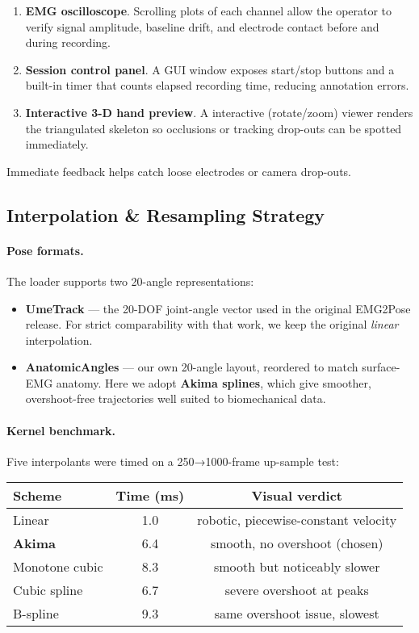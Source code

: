 \begin{enumerate}[label=\alph*]
    \item \textbf{EMG oscilloscope}.  
          Scrolling plots of each channel allow the operator to verify signal amplitude, baseline drift, and electrode contact before and during recording.
    \item \textbf{Session control panel}.  
          A GUI window exposes start/stop buttons and a built-in timer that counts elapsed recording time, reducing annotation errors.
    \item \textbf{Interactive 3-D hand preview}.  
          A interactive (rotate/zoom) viewer renders the triangulated skeleton so occlusions or tracking drop-outs can be spotted immediately.
\end{enumerate}

Immediate feedback helps catch loose electrodes or camera drop-outs.

\subsection{Interpolation \& Resampling Strategy}

\paragraph{Pose formats.}
The loader supports two 20-angle representations:

\begin{itemize}
  \item \textbf{UmeTrack} — the 20-DOF joint-angle vector used in the original
        EMG2Pose release.  For strict comparability with that work, we keep the
        original \emph{linear} interpolation.
  \item \textbf{AnatomicAngles} — our own 20-angle layout, reordered to match
        surface-EMG anatomy.  Here we adopt \textbf{Akima splines}, which give
        smoother, overshoot-free trajectories well suited to biomechanical
        data.
\end{itemize}

\paragraph{Kernel benchmark.}
Five interpolants were timed on a 250→1000-frame up-sample test:

\begin{center}\small
\begin{tabular}{@{}lcc@{}}
\toprule
Scheme            & Time (ms) & Visual verdict \\ \midrule
Linear            & 1.0  & robotic, piecewise-constant velocity \\
\textbf{Akima}    & 6.4  & smooth, no overshoot (chosen) \\
Monotone cubic    & 8.3  & smooth but noticeably slower \\
Cubic spline      & 6.7  & severe overshoot at peaks \\
B-spline          & 9.3  & same overshoot issue, slowest \\ \bottomrule
\end{tabular}
\end{center}

